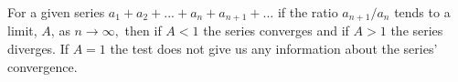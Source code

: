 For a given series $a_{1}+a_{2}+...+a_{n}+a_{n+1}+...$ if the ratio $a_{n+1}/a_{n}$  tends to a limit, $A$, as $ n \to \infty , $ then if $A < 1$ the series converges and if $A > 1$ the series diverges. If $A = 1$ the test does not give us any information about the series' convergence.  
  